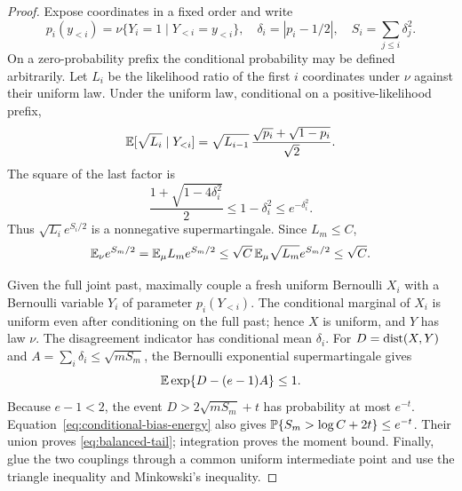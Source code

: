 \begin{proof}
Expose coordinates in a fixed order and write
\[
 p_i(y_{<i})=\nu\{Y_i=1\mid Y_{<i}=y_{<i}\},\quad
 \delta_i=|p_i-1/2|,\quad S_i=\sum_{j\le i}\delta_j^2.
\]
On a zero-probability prefix the conditional probability may be defined
arbitrarily. Let $L_i$ be the likelihood ratio of the first $i$
coordinates under $\nu$ against their uniform law. Under the uniform
law, conditional on a positive-likelihood prefix,
\[
 \mathbb E[\sqrt{L_i}\mid Y_{<i}]
 =\sqrt{L_{i-1}}\,
       \frac{\sqrt{p_i}+\sqrt{1-p_i}}{\sqrt2}.
\]
The square of the last factor is
\[
 \frac{1+\sqrt{1-4\delta_i^2}}2
 \le1-\delta_i^2\le e^{-\delta_i^2}.
\]
Thus $\sqrt{L_i}e^{S_i/2}$ is a nonnegative supermartingale. Since
$L_m\le C$,
\begin{equation}\label{eq:conditional-bias-energy}
 \mathbb E_\nu e^{S_m/2}
 =\mathbb E_\mu L_me^{S_m/2}
 \le\sqrt C\,\mathbb E_\mu\sqrt{L_m}e^{S_m/2}\le\sqrt C.
\end{equation}

Given the full joint past, maximally couple a fresh uniform Bernoulli
$X_i$ with a Bernoulli variable $Y_i$ of parameter $p_i(Y_{<i})$.
The conditional marginal of $X_i$ is uniform even after conditioning
on the full past; hence $X$ is uniform, and $Y$ has law $\nu$.
The disagreement indicator has conditional mean $\delta_i$.
For $D=\operatorname{dist}(X,Y)$ and $A=\sum_i\delta_i\le\sqrt{mS_m}$,
the Bernoulli exponential supermartingale gives
\[
 \mathbb E\exp\{D-(e-1)A\}\le1.
\]
Because $e-1<2$, the event $D>2\sqrt{mS_m}+t$ has probability at most
$e^{-t}$. Equation~\eqref{eq:conditional-bias-energy} also gives
$\mathbb P\{S_m>\log C+2t\}\le e^{-t}$. Their union proves
\eqref{eq:balanced-tail}; integration proves the moment bound.
Finally, glue the two couplings through a common uniform intermediate
point and use the triangle inequality and Minkowski's inequality.
\end{proof}

